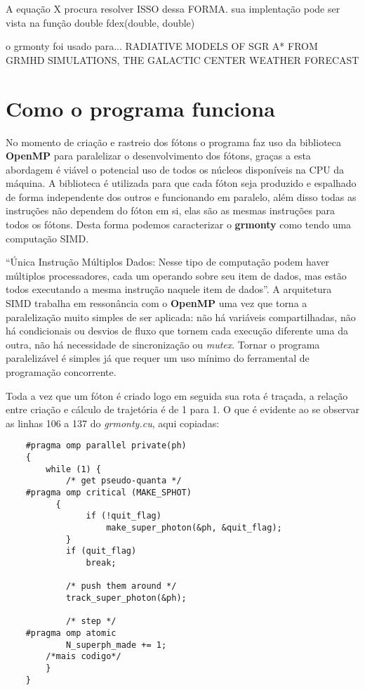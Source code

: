  A equação X procura resolver ISSO dessa FORMA. sua implentação pode ser vista na função double fdex(double, double)

  o grmonty foi usado para... RADIATIVE MODELS OF SGR A* FROM GRMHD SIMULATIONS, THE GALACTIC CENTER WEATHER FORECAST

\section{Como o programa funciona}
\label{sec:comofaz}

  No momento de criação e rastreio dos fótons o programa faz uso da biblioteca \textbf{OpenMP} para paralelizar o desenvolvimento dos fótons, graças a esta abordagem é viável o potencial uso de todos os núcleos disponíveis na CPU da máquina. A biblioteca é utilizada para que cada fóton seja produzido e espalhado de forma independente dos outros e funcionando em paralelo, além disso todas as instruções não dependem do fóton em si, elas são as mesmas instruções para todos os fótons. Desta forma podemos caracterizar o \textbf{grmonty} como tendo uma computação SIMD.

  ``Única Instrução Múltiplos Dados: Nesse tipo de computação podem haver múltiplos processadores, cada um operando sobre seu item de dados, mas estão todos executando a mesma instrução naquele item de dados''\citep[p.84, traduzido]{HCP:16}. A arquitetura SIMD trabalha em ressonância com o \textbf{OpenMP} uma vez que torna a paralelização muito simples de ser aplicada: não há variáveis compartilhadas, não há condicionais ou desvios de fluxo que tornem cada execução diferente uma da outra, não há necessidade de sincronização ou \textit{mutex}. Tornar o programa paralelizável é simples já que requer um uso mínimo do ferramental de programação concorrente.


  Toda a vez que um fóton é criado logo em seguida sua rota é traçada, a relação entre criação e cálculo de trajetória é de 1 para 1. O que é evidente ao se observar as linhas 106 a 137 do \textit{grmonty.cu}, aqui copiadas:

  \label{sec:main_loop}
  \begin{lstlisting}
    #pragma omp parallel private(ph)
  	{
  		while (1) {
  			/* get pseudo-quanta */
    #pragma omp critical (MAKE_SPHOT)
  		  {
  				if (!quit_flag)
  					make_super_photon(&ph, &quit_flag);
  			}
  			if (quit_flag)
  				break;

  			/* push them around */
  			track_super_photon(&ph);

  			/* step */
    #pragma omp atomic
  			N_superph_made += 1;
        /*mais codigo*/
  		}
  	}
  \end{lstlisting}

